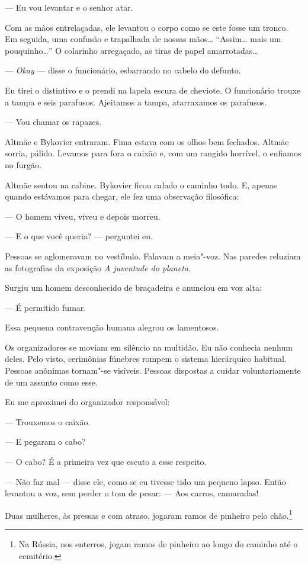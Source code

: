 --- Eu vou levantar e o senhor atar.

Com as mãos entrelaçadas, ele levantou o corpo como se este fosse um
tronco. Em seguida, uma confusão e trapalhada de nossas mãos\ldots{}
``Assim\ldots{} mais um pouquinho\ldots{}'' O colarinho arregaçado, as tiras de
papel amarrotadas\ldots{}

--- \emph{Okay} --- disse o funcionário, esbarrando no cabelo do
defunto.

Eu tirei o distintivo e o prendi na lapela escura de cheviote. O
funcionário trouxe a tampa e seis parafusos. Ajeitamos a tampa,
atarraxamos os parafusos.

--- Vou chamar os rapazes.

Altmäe e Bykovier entraram. Fima estava com os olhos bem fechados.
Altmäe sorria, pálido. Levamos para fora o caixão e, com um rangido
horrível, o enfiamos no furgão.

Altmäe sentou na cabine. Bykovier ficou calado o caminho todo. E, apenas
quando estávamos para chegar, ele fez uma observação filosófica:

--- O homem viveu, viveu e depois morreu.

--- E o que você queria? --- perguntei eu.

Pessoas se aglomeravam no vestíbulo. Falavam a meia"-voz. Nas paredes
reluziam as fotografias da exposição \emph{A juventude do planeta}.

Surgiu um homem desconhecido de braçadeira e anunciou em voz alta:

--- É permitido fumar.

Essa pequena contravenção humana alegrou os lamentosos.

Os organizadores se moviam em silêncio na multidão. Eu não conhecia
nenhum deles. Pelo visto, cerimônias fúnebres rompem o sistema
hierárquico habitual. Pessoas anônimas tornam"-se visíveis. Pessoas
dispostas a cuidar voluntariamente de um assunto como esse.

Eu me aproximei do organizador responsável:

--- Trouxemos o caixão.

--- E pegaram o cabo?

--- O cabo? É a primeira vez que escuto a esse respeito.

--- Não faz mal --- disse ele, como se eu tivesse tido um pequeno lapso.
Então levantou a voz, sem perder o tom de pesar: --- Aos carros,
camaradas!

Duas mulheres, às pressas e com atraso, jogaram ramos de pinheiro pelo
chão.\footnote{Na Rússia, nos enterros, jogam ramos de pinheiro ao longo
  do caminho até o cemitério.}

